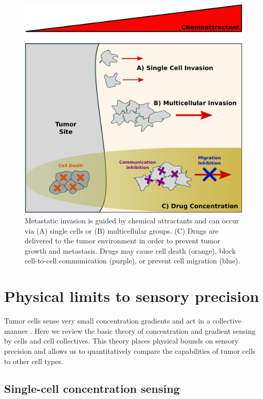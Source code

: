 \begin{figure}[tb]
    \centering
        \includegraphics[width=0.8\columnwidth]{../fig/ch1_fig1.pdf}
    \caption{Metastatic invasion is guided by chemical attractants and can occur via (A) single cells or (B) multicellular groups. (C) Drugs are delivered to the tumor environment in order to prevent tumor growth and metastasis. Drugs may cause cell death (orange), block cell-to-cell communication (purple), or prevent cell migration (blue).}
\label{overview}
\end{figure}



\section{Physical limits to sensory precision}

Tumor cells sense very small concentration gradients \cite{shields2007autologous} and act in a collective manner \cite{cheung2013collective, friedl2012classifying, aceto2014circulating, puliafito2015three}. Here we review the basic theory of concentration and gradient sensing by cells and cell collectives. This theory places physical bounds on sensory precision and allows us to quantitatively compare the capabilities of tumor cells to other cell types.

\subsection{Single-cell concentration sensing}

